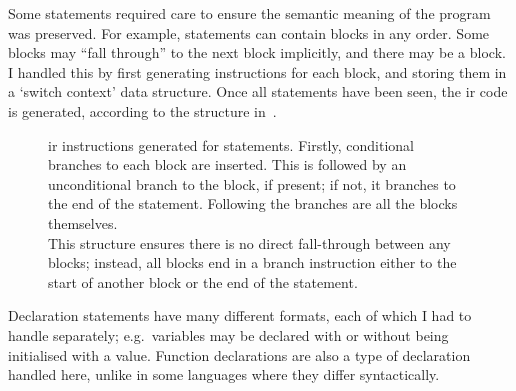 \documentclass[00-main.tex]{subfiles}
\begin{document}
Some statements required care to ensure the semantic meaning of the program was preserved.
For example,  statements can contain  blocks in any order.
Some blocks may ``fall through'' to the next block implicitly, and there may be a  block.
I handled this by first generating instructions for each  block, and storing them in a `switch context' data structure.
Once all  statements have been seen, the \gls{ir} code is generated, according to the structure in~.


\begin{figure}[t]
  \centering
  \caption{%
    \gls{ir} instructions generated for  statements.
    Firstly, conditional branches to each  block are inserted.
    This is followed by an unconditional branch to the  block, if present; if not, it branches to the end of the  statement.
    Following the branches are all the  blocks themselves. \\
    This structure ensures there is no direct fall-through between any  blocks; instead, all blocks end in a branch instruction either to the start of another block or the end of the  statement.
  }
  \label{fig:instr structure for switch statements} %
\end{figure}

Declaration statements have many different formats, each of which I had to handle separately; e.g.~variables may be declared with or without being initialised with a value.
Function declarations are also a type of declaration handled here, unlike in some languages where they differ syntactically.
\end{document}
